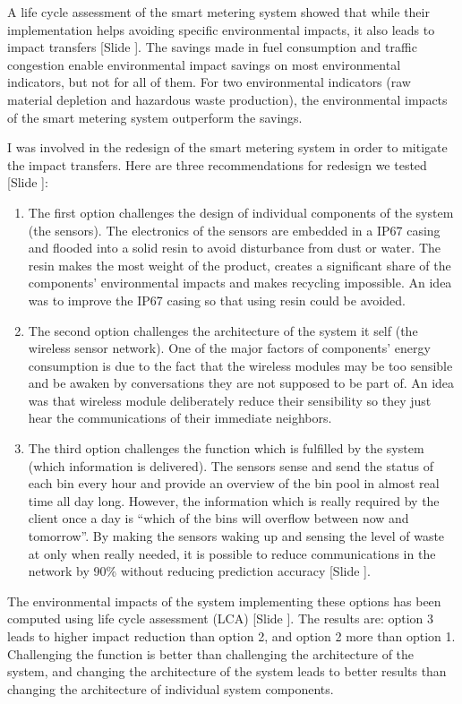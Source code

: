 \documentclass{article}
\newcounter{slide}
\begin{document}
A life cycle assessment of the smart metering system showed that while their implementation helps avoiding specific environmental impacts, it also leads to impact transfers {\color{blue}[Slide ]}. The savings made in fuel consumption and traffic congestion enable environmental impact savings on most environmental indicators, but not for all of them. For two environmental indicators (raw material depletion and hazardous waste production), the environmental impacts of the smart metering system outperform the savings. 

I was involved in the redesign of the smart metering system in order to mitigate the impact transfers. Here are three recommendations for redesign we tested {\color{blue}[Slide ]}:
\begin{enumerate}
	\item The first option challenges the design of individual components of the system (the sensors). The electronics of the sensors are embedded in a IP67 casing and flooded into a solid resin to avoid disturbance from dust or water. The resin makes the most weight of the product, creates a significant share of the components' environmental impacts and makes recycling impossible. An idea was to improve the IP67 casing so that using resin could be avoided.
	\item The second option challenges the architecture of the system it self (the wireless sensor network). One of the major factors of components' energy consumption is due to the fact that the wireless modules may be too sensible and be awaken by conversations they are not supposed to be part of. An idea was that wireless module deliberately reduce their sensibility so they just hear the communications of their immediate neighbors. 
	\item The third option challenges the function which is fulfilled by the system (which information is delivered). The sensors sense and send the status of each bin every hour and provide an overview of the bin pool in almost real time all day long. However, the information which is really required by the client once a day is ``which of the bins will overflow between now and tomorrow''. By making the sensors waking up and sensing the level of waste at only when really needed, it is possible to reduce communications in the network by 90\% without reducing prediction accuracy {\color{blue}[Slide ]}.
\end{enumerate}
The environmental impacts of the system implementing these options has been computed using life cycle assessment (LCA) {\color{blue}[Slide ]}. The results are: option 3 leads to higher impact reduction than option 2, and option 2 more than option 1. Challenging the function is better than challenging the architecture of the system, and changing the architecture of the system leads to better results than changing the architecture of individual system components. 
\end{document}
